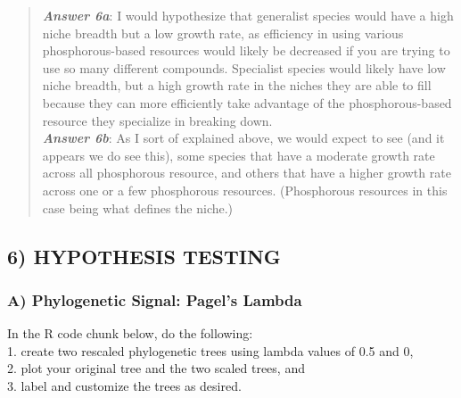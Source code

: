 \documentclass[]{article}
\begin{document}
\begin{quote}
\textbf{\emph{Answer 6a}}: I would hypothesize that generalist species
would have a high niche breadth but a low growth rate, as efficiency in
using various phosphorous-based resources would likely be decreased if
you are trying to use so many different compounds. Specialist species
would likely have low niche breadth, but a high growth rate in the
niches they are able to fill because they can more efficiently take
advantage of the phosphorous-based resource they specialize in breaking
down.\\
\textbf{\emph{Answer 6b}}: As I sort of explained above, we would expect
to see (and it appears we do see this), some species that have a
moderate growth rate across all phosphorous resource, and others that
have a higher growth rate across one or a few phosphorous resources.
(Phosphorous resources in this case being what defines the niche.)
\end{quote}

\subsection{6) HYPOTHESIS TESTING}\label{hypothesis-testing}

\subsubsection{A) Phylogenetic Signal: Pagel's
Lambda}\label{a-phylogenetic-signal-pagels-lambda}

In the R code chunk below, do the following:\\
1. create two rescaled phylogenetic trees using lambda values of 0.5 and
0,\\
2. plot your original tree and the two scaled trees, and\\
3. label and customize the trees as desired.
\end{document}
